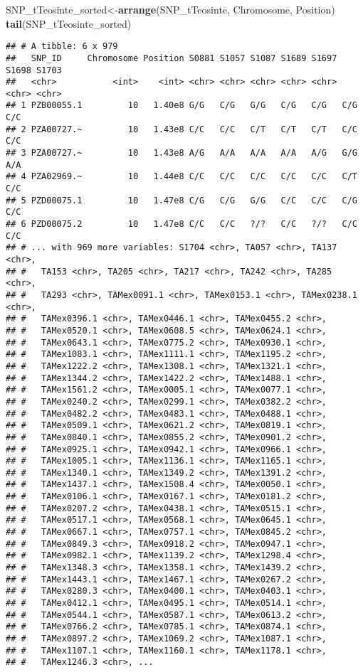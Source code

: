\documentclass[]{article}
\newenvironment{Shaded}{\begin{snugshade}}{\end{snugshade}}
\newcommand{\KeywordTok}[1]{\textcolor[rgb]{0.13,0.29,0.53}{\textbf{#1}}}
\newcommand{\NormalTok}[1]{#1}
\begin{document}
\begin{Shaded}
\begin{Highlighting}[]
\NormalTok{SNP_tTeosinte_sorted<-}\KeywordTok{arrange}\NormalTok{(SNP_tTeosinte, Chromosome, Position)}
\KeywordTok{tail}\NormalTok{(SNP_tTeosinte_sorted)}
\end{Highlighting}
\end{Shaded}

\begin{verbatim}
## # A tibble: 6 x 979
##   SNP_ID     Chromosome Position S0881 S1057 S1087 S1689 S1697 S1698 S1703
##   <chr>           <int>    <int> <chr> <chr> <chr> <chr> <chr> <chr> <chr>
## 1 PZB00055.1         10   1.40e8 G/G   C/G   G/G   C/G   C/G   C/G   C/C  
## 2 PZA00727.~         10   1.43e8 C/C   C/C   C/T   C/T   C/T   C/C   C/C  
## 3 PZA00727.~         10   1.43e8 A/G   A/A   A/A   A/A   A/G   G/G   A/A  
## 4 PZA02969.~         10   1.44e8 C/C   C/C   C/C   C/C   C/C   C/T   C/C  
## 5 PZD00075.1         10   1.47e8 C/G   C/G   G/G   C/C   C/C   C/G   C/C  
## 6 PZD00075.2         10   1.47e8 C/C   C/C   ?/?   C/C   ?/?   C/C   C/C  
## # ... with 969 more variables: S1704 <chr>, TA057 <chr>, TA137 <chr>,
## #   TA153 <chr>, TA205 <chr>, TA217 <chr>, TA242 <chr>, TA285 <chr>,
## #   TA293 <chr>, TAMex0091.1 <chr>, TAMex0153.1 <chr>, TAMex0238.1 <chr>,
## #   TAMex0396.1 <chr>, TAMex0446.1 <chr>, TAMex0455.2 <chr>,
## #   TAMex0520.1 <chr>, TAMex0608.5 <chr>, TAMex0624.1 <chr>,
## #   TAMex0643.1 <chr>, TAMex0775.2 <chr>, TAMex0930.1 <chr>,
## #   TAMex1083.1 <chr>, TAMex1111.1 <chr>, TAMex1195.2 <chr>,
## #   TAMex1222.2 <chr>, TAMex1308.1 <chr>, TAMex1321.1 <chr>,
## #   TAMex1344.2 <chr>, TAMex1422.2 <chr>, TAMex1488.1 <chr>,
## #   TAMex1561.2 <chr>, TAMex0005.1 <chr>, TAMex0077.1 <chr>,
## #   TAMex0240.2 <chr>, TAMex0299.1 <chr>, TAMex0382.2 <chr>,
## #   TAMex0482.2 <chr>, TAMex0483.1 <chr>, TAMex0488.1 <chr>,
## #   TAMex0509.1 <chr>, TAMex0621.2 <chr>, TAMex0819.1 <chr>,
## #   TAMex0840.1 <chr>, TAMex0855.2 <chr>, TAMex0901.2 <chr>,
## #   TAMex0925.1 <chr>, TAMex0942.1 <chr>, TAMex0966.1 <chr>,
## #   TAMex1005.1 <chr>, TAMex1136.1 <chr>, TAMex1165.1 <chr>,
## #   TAMex1340.1 <chr>, TAMex1349.2 <chr>, TAMex1391.2 <chr>,
## #   TAMex1437.1 <chr>, TAMex1508.4 <chr>, TAMex0050.1 <chr>,
## #   TAMex0106.1 <chr>, TAMex0167.1 <chr>, TAMex0181.2 <chr>,
## #   TAMex0207.2 <chr>, TAMex0438.1 <chr>, TAMex0515.1 <chr>,
## #   TAMex0517.1 <chr>, TAMex0568.1 <chr>, TAMex0645.1 <chr>,
## #   TAMex0667.1 <chr>, TAMex0757.1 <chr>, TAMex0845.2 <chr>,
## #   TAMex0849.3 <chr>, TAMex0918.2 <chr>, TAMex0947.1 <chr>,
## #   TAMex0982.1 <chr>, TAMex1139.2 <chr>, TAMex1298.4 <chr>,
## #   TAMex1348.3 <chr>, TAMex1358.1 <chr>, TAMex1439.2 <chr>,
## #   TAMex1443.1 <chr>, TAMex1467.1 <chr>, TAMex0267.2 <chr>,
## #   TAMex0280.3 <chr>, TAMex0400.1 <chr>, TAMex0403.1 <chr>,
## #   TAMex0412.1 <chr>, TAMex0495.1 <chr>, TAMex0514.1 <chr>,
## #   TAMex0544.1 <chr>, TAMex0587.1 <chr>, TAMex0613.2 <chr>,
## #   TAMex0766.2 <chr>, TAMex0785.1 <chr>, TAMex0874.1 <chr>,
## #   TAMex0897.2 <chr>, TAMex1069.2 <chr>, TAMex1087.1 <chr>,
## #   TAMex1107.1 <chr>, TAMex1160.1 <chr>, TAMex1178.1 <chr>,
## #   TAMex1246.3 <chr>, ...
\end{verbatim}
\end{document}
